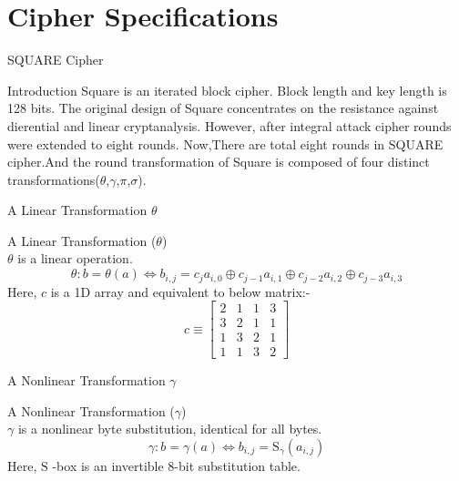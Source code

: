 \section{Cipher Specifications}

\begin{frame}{SQUARE Cipher}
  \begin{beamerboxesrounded}{Introduction}
      Square is an iterated block cipher. Block length and key length is 128 bits.
      The original design of Square concentrates on the resistance against dierential and linear cryptanalysis. However, after integral attack cipher rounds were extended to eight rounds. Now,There are total eight rounds in SQUARE cipher.And the round transformation of Square is composed of four distinct transformations($\theta$,$\gamma$,$\pi$,$\sigma$).
  \end{beamerboxesrounded}
\end{frame}


\begin{frame}{A Linear Transformation $\theta$}
    \begin{beamerboxesrounded}{A Linear Transformation ($\theta$)} \\
        $\theta$ is a linear operation.
        $$
        \theta: b=\theta(a) \Leftrightarrow b_{i, j}=c_{j} a_{i, 0} \oplus c_{j-1} a_{i, 1} \oplus c_{j-2} a_{i, 2} \oplus c_{j-3} a_{i, 3}
        $$
        Here, $c$ is a 1D array and equivalent to below matrix:-  \\
        \begin{equation*}
          c   \equiv \begin{bmatrix}
            2 & 1 & 1 & 3 \\
            3 & 2 & 1 & 1 \\
            1 & 3 & 2 & 1 \\
            1 & 1 & 3 & 2
          \end{bmatrix}
        \end{equation*}
    \end{beamerboxesrounded}
\end{frame}

\begin{frame}{A Nonlinear Transformation $\gamma$}
    \begin{beamerboxesrounded}{A Nonlinear Transformation ($\gamma$)}\\
        $\gamma$ is a nonlinear byte substitution, identical for all bytes.
        $$
        \gamma: b=\gamma(a) \Leftrightarrow b_{i, j}=\mathrm{S}_{\gamma}\left(a_{i, j}\right)
        $$
        Here, $\mathrm{S}$ -box is an invertible 8-bit substitution table. 
    \end{beamerboxesrounded}
\end{frame}

